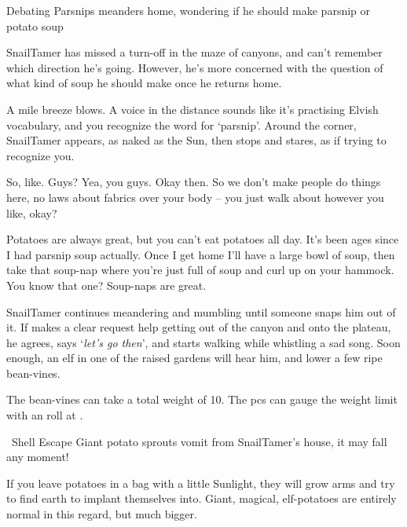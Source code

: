 
{Debating Parsnips}%
{ meanders home, wondering if he should make parsnip or potato soup}%

\Gls{SnailTamer} has missed a turn-off in the maze of canyons, and can't remember which direction he's going.
However, he's more concerned with the question of what kind of soup he should make once he returns home.

\begin{boxtext}
  A mile breeze blows.
  A voice in the distance sounds like it's practising Elvish vocabulary, and you recognize the word for `parsnip'.
  Around the corner, \gls{SnailTamer} appears, as naked as the Sun, then stops and stares, as if trying to recognize you.
\end{boxtext}

\begin{speechtext}
  So, like.  Guys?  Yea, you guys.  Okay then.  So we don't make people do things here, no laws about fabrics over your body -- you just walk about however you like, okay?

  Potatoes are always great, but you can't eat potatoes all day.
  It's been ages since I had parsnip soup actually.
  Once I get home I'll have a large bowl of soup, then take that soup-nap where you're just full of soup and curl up on your hammock.
  You know that one?
  Soup-naps are great.
\end{speechtext}

\Gls{SnailTamer} continues meandering and mumbling until someone snaps him out of it.
If  makes a clear request help getting out of the canyon and onto the plateau, he agrees, says `\textit{let's go then}', and starts walking while whistling a sad song.
Soon enough, an elf in one of the raised gardens will hear him, and lower a few ripe bean-vines.

The bean-vines can take a total \gls{weight} of 10.
The \glspl{pc} can gauge the weight limit with an  roll at \tn[8].

{~Shell Escape}%
{Giant potato sprouts vomit from \gls{SnailTamer}'s house, it may fall any moment!}%

If you leave potatoes in a bag with a little Sunlight, they will grow arms and try to find earth to implant themselves into.
Giant, magical, elf-potatoes are entirely normal in this regard, but much bigger.


